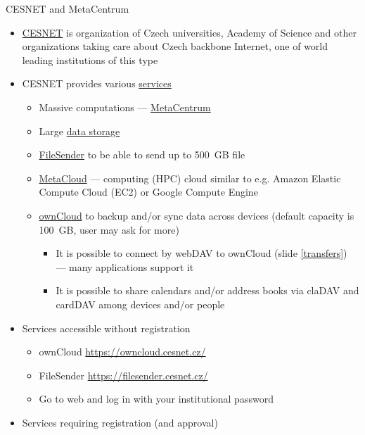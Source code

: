 \documentclass[compress, ucs, xelatex, 11pt, xcolor=svgnames,
  hyperref={
    bookmarks=true,
    unicode=true,
    colorlinks=true,
    pdftitle={Linux, command line and MetaCentrum},
    plainpages=false,
    pdfauthor={Vojtech Zeisek},
    pdfsubject={Course about use of Linux command line, writing shell scripts and using MetaCentrum of CESNET},
    pdfcreator={XeLaTeX},
    pdfkeywords={Linux, GNU, BASH, shell, command line, MetaCentrum},
    linkcolor=DarkRed,
    anchorcolor=DarkBlue,
    citecolor=Indigo,
    filecolor=NavyBlue,
    menucolor=DarkMagenta,
    urlcolor=DarkBlue,
    pdftex},
  url={hyphens, lowtilde} %
  ]{beamer}
\begin{document}
\begin{frame}[allowframebreaks]{CESNET and MetaCentrum}
  \begin{itemize}
    \item \href{https://www.cesnet.cz/?lang=en}{CESNET} is organization of Czech universities, Academy of Science and other organizations taking care about Czech backbone Internet, one of world leading institutions of this type
    \item CESNET provides various \href{https://www.cesnet.cz/services/?lang=en}{services}
    \begin{itemize}
      \item Massive computations --- \href{https://www.cesnet.cz/services/massive-computations-metacentrum/?lang=en}{MetaCentrum}
      \item Large \href{https://www.cesnet.cz/services/data-storage/?lang=en}{data storage}
      \item \href{https://www.cesnet.cz/services/filesender/?lang=en}{FileSender} to be able to send up to 500~GB file
      \item \href{https://www.metacentrum.cz/en/Sluzby/MetaCloud/}{MetaCloud} --- computing (HPC) cloud similar to e.g. Amazon Elastic Compute Cloud (EC2) or Google Compute Engine
      \item \href{https://www.cesnet.cz/services/owncloud/?lang=en}{ownCloud} to backup and/or sync data across devices (default capacity is 100~GB, user may ask for more)
      \begin{itemize}
	\item It is possible to connect by webDAV to ownCloud (slide \ref{transfers}) --- many applications support it
	\item It is possible to share calendars and/or address books via claDAV and cardDAV among devices and/or people
      \end{itemize}
    \end{itemize}
    \item Services accessible without registration
    \begin{itemize}
      \item ownCloud \url{https://owncloud.cesnet.cz/}
      \item FileSender \url{https://filesender.cesnet.cz/}
      \item Go to web and log in with your institutional password
    \end{itemize}
    \item Services requiring registration (and approval)
    \begin{itemize}

\end{itemize}
\end{itemize}
\end{frame}
\end{document}
